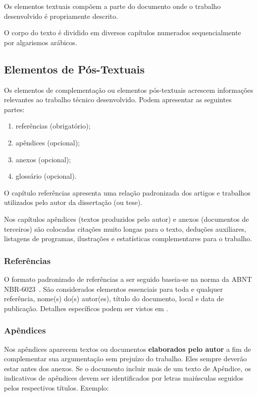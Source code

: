 \documentclass[repeatfields,xlists,xpacks,oneside]{ufrgscca}
\begin{document}
Os elementos textuais compõem a parte do documento onde o trabalho
desenvolvido é propriamente descrito.

O corpo do texto é dividido em diversos capítulos numerados sequencialmente
por algarismos arábicos.

\subsection{Elementos de Pós-Textuais}

Os elementos de complementação ou elementos pós-textuais acrescem
informações relevantes ao trabalho técnico desenvolvido. Podem apresentar as
seguintes partes:

\begin{enumerate}
\item referências (obrigatório);
\item apêndices (opcional);
\item anexos (opcional);
\item glossário (opcional).
\end{enumerate}

O capítulo referências apresenta uma relação padronizada dos artigos e
trabalhos utilizados pelo autor da dissertação (ou tese).

Nos capítulos apêndices (textos produzidos pelo autor) e anexos (documentos
de terceiros) são colocadas citações muito longas para o texto, deduções
auxiliares, listagens de programas, ilustrações e estatísticas
complementares para o trabalho.

\subsubsection{Referências}
O formato padronizado de referências a ser seguido baseia-se na norma da ABNT
NBR-6023~\cite{ABNT:NBR-6023-2002}. São considerados
elementos essenciais para toda e qualquer referência, nome(s) do(s)
autor(es), título do documento, local e data de publicação. Detalhes específicos podem ser vistos em .


\subsubsection{Apêndices}

Nos apêndices aparecem textos ou documentos {\bf elaborados pelo autor}  a
fim de complementar sua argumentação sem prejuízo do trabalho. Eles sempre
deverão estar antes dos anexos. Se o documento incluir mais de um texto de
Apêndice, os indicativos de apêndices devem ser identificados por letras
maiúsculas seguidos pelos respectivos títulos. Exemplo:\\
\end{document}
